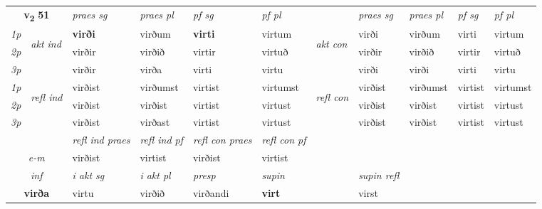 \noindent
\begin{tabular}{lllllllllll} \toprule
\multicolumn{2}{c}{\textbf{v{\textsubscript{2}}} \Large{\textbf{51}}}  &  \textit{praes sg}  & \textit{praes pl}  &\textit{ pf sg} & \textit{pf pl} &  &  \textit{praes sg}  & \textit{praes pl}  & \textit{pf sg} & \textit{pf pl } \\*
	\cmidrule{3-6} \cmidrule{8-11}
 {\textit{1p}} & \multirow{3}{*}{\begin{turn}{90}\textit{akt ind}\end{turn}} & \textbf{virði} & virðum & \textbf{virti} & virtum & \multirow{3}{*}{\begin{turn}{90}\textit{akt con}\end{turn}} &virði & virðum & virti & virtum\\*
 {\textit{2p}} &  &  virðir  & virðið & virtir & virtuð & & virðir & virðið & virtir & virtuð \\*
{\textit{3p}} &  & virðir & virða & virti & virtu & & virði & virði& virti & virtu \\*
\cmidrule{3-6} \cmidrule{8-11}
 {\textit{1p}} & \multirow{3}{*}{\begin{turn}{90}\textit{refl ind}\end{turn}}  & virðist & virðumst & virtist & virtumst & \multirow{3}{*}{\begin{turn}{90}\textit{refl con}\end{turn}}  &virðist & virðumst & virtist & virtumst \\*
 {\textit{2p}} &  & virðist & virðist & virtist & virtust & &virðist & virðist & virtist & virtust \\*
 {\textit{3p}}  & & virðist & virðast & virtist & virtust & & virðist & virðist& virtist & virtust \\*
\cmidrule{3-6} \cmidrule{8-11}

 & & \textit{refl ind praes} & \textit{refl ind pf} & \textit{refl con praes} & \textit{refl con pf} \\*
 \multicolumn{2}{c}{ \textit{e-m} }& virðist & virtist & virðist & virtist \\*

\cmidrule{3-8}
   \multicolumn{2}{c}{\textit{inf}}  & \textit{i akt sg} & \textit{i akt pl}   & \textit{presp} & \textit{supin} && \textit{supin refl}  \\*
  \multicolumn{2}{c}{\textbf{virða}} & virtu  & virðið   & virðandi &  \textbf{virt} && virst  \\*
\end{tabular}

